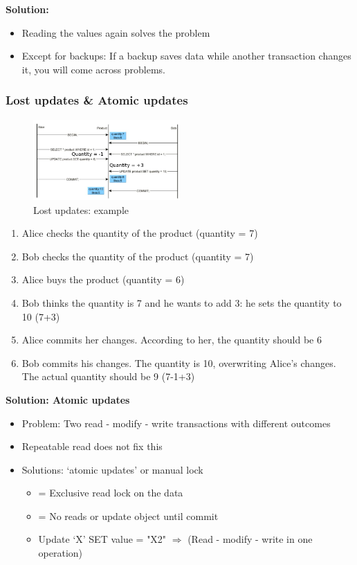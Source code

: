 \documentclass{article}
\begin{document}
\textbf{Solution:}

\begin{itemize}
    \item Reading the values again solves the problem
    \item Except for backups: If a backup saves data while another transaction changes it, you will come across problems.
\end{itemize}


\subsubsection{Lost updates \& Atomic updates}

\begin{figure}[H]
    \centering
    \includegraphics[width=0.5\textwidth]{lost-updates-atomic-updates.png}
    \caption{Lost updates: example}
\end{figure}

\begin{enumerate}
    \item Alice checks the quantity of the product (quantity = 7)
    \item Bob checks the quantity of the product (quantity = 7)
    \item Alice buys the product (quantity = 6)
    \item Bob thinks the quantity is 7 and he wants to add 3: he sets the quantity to 10 (7+3)
    \item Alice commits her changes. According to her, the quantity should be 6
    \item Bob commits his changes. The quantity is 10, overwriting Alice's changes. The actual quantity should be 9 (7-1+3)
\end{enumerate}

\textbf{Solution: Atomic updates}

\begin{itemize}
    \item Problem: Two read - modify - write transactions with different outcomes
    \item Repeatable read does not fix this
    \item Solutions: `atomic updates' or manual lock
    \begin{itemize}
        \item = Exclusive read lock on the data
        \item = No reads or update object until commit
        \item Update `X' SET value = "X2" $\Rightarrow$ (Read - modify - write in one operation)
    \end{itemize}
\end{itemize}
\end{document}
